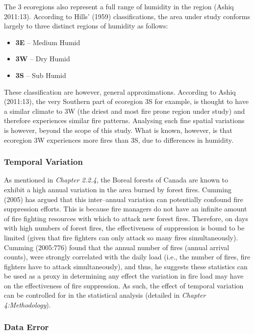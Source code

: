 \begin{spacing}{1.5}
\noindent The 3 ecoregions also represent a full range of humidity in the region (Ashiq 2011:13). According to Hills' (1959) classifications, the area under study conforms largely to three distinct regions of humidity as follows:

\begin{itemize}
  \item \textbf{3E} -- Medium Humid
  \item \textbf{3W} -- Dry Humid
  \item \textbf{3S} -- Sub Humid \\
\end{itemize}

\noindent These classification are however, general approximations. According to Ashiq (2011:13), the very Southern part of ecoregion 3S for example, is thought to have a similar climate to 3W (the driest and most fire prone region under study) and therefore experiences similar fire patterns. Analysing such fine spatial variations is however, beyond the scope of this study. What is known, however, is that ecoregion 3W experiences more fires than 3S, due to differences in humidity.

\subsubsection{Temporal Variation}

As mentioned in \emph{Chapter 2.2.4}, the Boreal forests of Canada are known to exhibit a high annual variation in the area burned by forest fires. Cumming (2005) has argued that this inter--annual variation can potentially confound fire suppression efforts. This is because fire managers do not have an infinite amount of fire fighting resources with which to attack new forest fires. Therefore, on days with high numbers of forest fires, the effectiveness of suppression is bound to be limited (given that fire fighters can only attack so many fires simultaneously). Cumming (2005:776) found that the annual number of fires (annual arrival counts), were strongly correlated with the daily load (i.e., the number of fires, fire fighters have to attack simultaneously), and thus, he suggests these statistics can be used as a proxy in determining any effect the variation in fire load may have on the effectiveness of fire suppression. As such, the effect of temporal variation can be controlled for in the statistical analysis (detailed in \emph{Chapter 4:Methodology}).

\subsubsection{Data Error}


\end{spacing}
